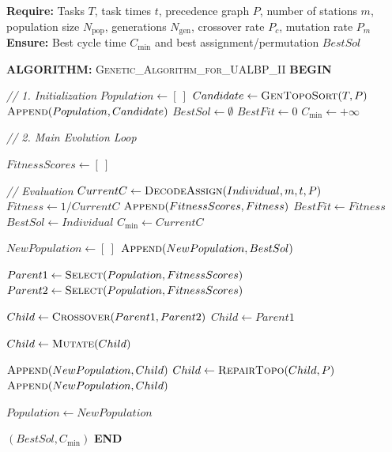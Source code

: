 \documentclass[12pt,a4paper]{article}
\begin{document}
\begin{algorithmic}[1]
\Statex \textbf{Require:} Tasks $T$, task times $t$, precedence graph $P$, number of stations $m$,
population size $N_{\text{pop}}$, generations $N_{\text{gen}}$, crossover rate $P_c$, mutation rate $P_m$
\Statex \textbf{Ensure:} Best cycle time $C_{\min}$ and best assignment/permutation $BestSol$
\Statex

\Statex \textbf{ALGORITHM:} \textsc{Genetic\_Algorithm\_for\_UALBP\_II}
\Statex \textbf{BEGIN}

\Statex \textit{// 1. Initialization}
\State $Population \gets [\ ]$
    \State $Candidate \gets \Call{GenTopoSort}{T,P}$
    \State $\Call{Append}{Population, Candidate}$
\EndFor
\State $BestSol \gets \emptyset$
\State $BestFit \gets 0$
\State $C_{\min} \gets +\infty$

\Statex \textit{// 2. Main Evolution Loop}

    \State $FitnessScores \gets [\ ]$

    \Statex \textit{// Evaluation}
        \State $CurrentC \gets \Call{DecodeAssign}{Individual,m,t,P}$
        \State $Fitness \gets 1/CurrentC$
        \State $\Call{Append}{FitnessScores, Fitness}$
            \State $BestFit \gets Fitness$
            \State $BestSol \gets Individual$
            \State $C_{\min} \gets CurrentC$
        \EndIf
    \EndFor

    \State $NewPopulation \gets [\ ]$
    \State $\Call{Append}{NewPopulation, BestSol}$ 

        \State $Parent1 \gets \Call{Select}{Population,FitnessScores}$
        \State $Parent2 \gets \Call{Select}{Population,FitnessScores}$

            \State $Child \gets \Call{Crossover}{Parent1,Parent2}$
        \Else
            \State $Child \gets Parent1$
        \EndIf

            \State $Child \gets \Call{Mutate}{Child}$
        \EndIf

            \State $\Call{Append}{NewPopulation, Child}$
        \Else
            \State $Child \gets \Call{RepairTopo}{Child,P}$
            \State $\Call{Append}{NewPopulation, Child}$
        \EndIf
    \EndWhile

    \State $Population \gets NewPopulation$
\EndFor

\State \Return $(BestSol, C_{\min})$
\Statex \textbf{END}
\end{algorithmic}
\end{document}
